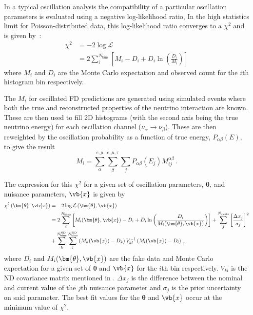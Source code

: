 In a typical oscillation analysis the compatibility of a particular oscillation parameters is evaluated using a negative log-likelihood ratio,
In the high statistics limit for Poisson-distributed data, this log-likelihood ratio converges to a $\chi^{2}$ and is given by~\cite{pdg2018}:
\begin{align}
	\chi^{2} &= -2 \log \mathcal{L} \\
	& = 2 \sum_{i}^{N_{\text{bins}}} \left[ M_{i} - D_{i} + D_{i} \ln \left( \frac{D_{i}}{M_{i}} \right) \right]
\end{align}
where $M_{i}$ and $D_{i}$ are the Monte Carlo expectation and observed count for the $i$th histogram bin respectively.

The $M_{i}$ for oscillated FD predictions are generated using simulated events where both the true and reconstructed properties of the neutrino interaction are known.
These are then used to fill 2D histograms (with the second axis being the true neutrino energy) for each oscillation channel ($\nu_{\alpha} \rightarrow \nu_{\beta}$).
These are then reweighted by the oscillation probability as a function of true energy, $P_{\alpha\beta}(E)$, to give the result
\begin{equation}
	M_{i} = \sum_{\alpha}^{e, \mu} \sum_{\beta}^{e, \mu, \tau} \sum_{j} P_{\alpha\beta}(E_{j}) M_{ij}^{\alpha\beta} \, .	
\end{equation}

The expression for this $\chi^{2}$ for a given set of oscillation parameters, $\bm{\theta}$, and nuisance parameters, $\vb{x}$ is given by
\begin{align}
	\chi^{2} \left( \bm{\theta}, \vb{x} \right) &= -2 \log \mathcal{L} \left( \bm{\theta}, \vb{x} \right) \\
	&= 2 \sum_{i}^{N_{\text{bins}}} \left[ M_{i} (\bm{\theta}, \vb{x}) - D_{i} + D_{i} \ln \left( \frac{D_{i}}{M_{i}(\bm{\theta}, \vb{x})} \right) \right] + \sum_{j}^{N_{\text{systs}}} \left[ \frac{\Delta x_{j}}{\sigma_{j}} \right]^{2} \nonumber \\
	&+ \sum_{k}^{N^{\text{ND}}_{\text{bins}}} \sum_{l}^{ N_{\text{bins}}^{\text{ND}} } \left(  M_{k} (\vb{x}) - D_{k} \right) V_{kl}^{-1} \left( M_{l}(\vb{x}) - D_{l} \right) \, ,
\end{align}
where $D_{i}$ and $M_{i}(\bm{\theta}, \vb{x})$ are the fake data and Monte Carlo expectation for a given set of $\bm{\theta}$ and $\vb{x}$ for the $i$th bin respectively. 
$V_{kl}$ is the ND covariance matrix mentioned in .
$\Delta x_{j}$ is the difference between the nominal and current value of the $j$th nuisance parameter and $\sigma_{j}$ is the prior uncertainty on said parameter.
The best fit values for the $\bm{\theta}$ and $\vb{x}$ occur at the minimum value of $\chi^{2}$.



